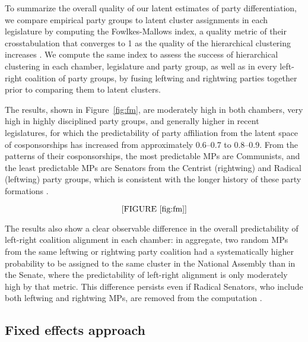 To summarize the overall quality of our latent estimates of party differentiation, we compare empirical party groups to latent cluster assignments in each legislature by computing the Fowlkes-Mallows index, a quality metric of their crosstabulation that converges to 1 as the quality of the hierarchical clustering increases \citep{FowlkesMallows1983-JASA}.%
  We compute the same index to assess the success of hierarchical clustering in each chamber, legislature and party group, as well as in every left-right coalition of party groups, by fusing leftwing and rightwing parties together prior to comparing them to latent clusters.%

The results, shown in Figure~\ref{fig:fm}, are moderately high in both chambers, very high in highly disciplined party groups, and generally higher in recent legislatures, for which the predictability of party affiliation from the latent space of cosponsorships has increased from approximately 0.6--0.7 to 0.8--0.9. From the patterns of their cosponsorships, the most predictable MPs are Communists, and the least predictable MPs are Senators from the Centrist (rightwing) and Radical (leftwing) party groups, which is consistent with the longer history of these party formations \citep[p.~70-71 and 77-78]{Sauger2010}.%

$$\textrm{[FIGURE~\ref{fig:fm}]}$$

The results also show a clear observable difference in the overall predictability of left-right coalition alignment in each chamber: in aggregate, two random MPs from the same leftwing or rightwing party coalition had a systematically higher probability to be assigned to the same cluster in the National Assembly than in the Senate, where the predictability of left-right alignment is only moderately high by that metric. This difference persists even if Radical Senators, who include both leftwing and rightwing MPs, are removed from the computation \citep[as suggested in][p.~80]{Sauger2010}.%

\subsection{Fixed effects approach}

